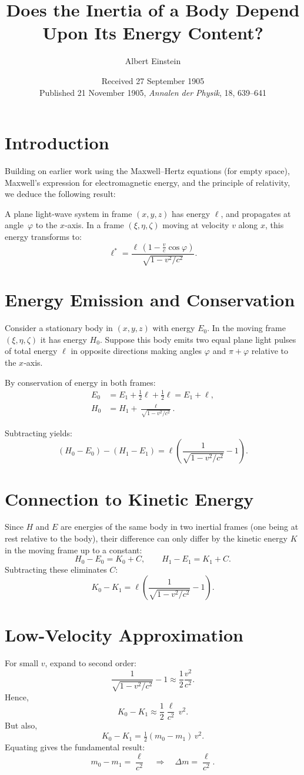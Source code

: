 \documentclass[12pt]{article}
\title{Does the Inertia of a Body Depend Upon Its Energy Content?}
\author{Albert Einstein}
\date{Received 27 September 1905\\Published 21 November 1905, \emph{Annalen der Physik}, 18, 639–641}
\begin{document}
\maketitle

\section*{Introduction}
Building on earlier work using the Maxwell--Hertz equations (for empty space), Maxwell's expression for electromagnetic energy, and the principle of relativity, we deduce the following result:

A plane light‐wave system in frame $(x,y,z)$ has energy $\ell$, and propagates at angle~$\varphi$ to the $x$‐axis. In a frame $(\xi,\eta,\zeta)$ moving at velocity $v$ along $x$, this energy transforms to:
\[
\ell^* = \frac{\ell\,(1 - \tfrac{v}{c}\cos\varphi)}{\sqrt{1 - v^2/c^2}}.
\]

\section*{Energy Emission and Conservation}
Consider a stationary body in $(x,y,z)$ with energy $E_0$. In the moving frame $(\xi,\eta,\zeta)$ it has energy $H_0$. Suppose this body emits two equal plane light pulses of total energy $\ell$ in opposite directions making angles $\varphi$ and $\pi + \varphi$ relative to the $x$‐axis.

By conservation of energy in both frames:
\begin{align*}
E_0 &= E_1 + \tfrac12\ell + \tfrac12\ell = E_1 + \ell,\\
H_0 &= H_1 + \frac{\ell}{\sqrt{1 - v^2/c^2}}.
\end{align*}

Subtracting yields:
\[
(H_0 - E_0) - (H_1 - E_1) = \ell\left( \frac{1}{\sqrt{1 - v^2/c^2}} - 1 \right).
\]

\section*{Connection to Kinetic Energy}
Since $H$ and $E$ are energies of the same body in two inertial frames (one being at rest relative to the body), their difference can only differ by the kinetic energy $K$ in the moving frame up to a constant:
\[
H_0 - E_0 = K_0 + C,\qquad H_1 - E_1 = K_1 + C.
\]
Subtracting these eliminates $C$:
\[
K_0 - K_1 = \ell\left( \frac{1}{\sqrt{1 - v^2/c^2}} - 1 \right).
\]

\section*{Low-Velocity Approximation}
For small $v$, expand to second order:
\[
\frac{1}{\sqrt{1 - v^2/c^2}} - 1 \approx \frac12\frac{v^2}{c^2}.
\]
Hence,
\[
K_0 - K_1 \approx \frac12\frac{\ell}{c^2}\,v^2.
\]
But also,
\[
K_0 - K_1 = \tfrac12(m_0 - m_1)\,v^2.
\]
Equating gives the fundamental result:
\[
m_0 - m_1 = \frac{\ell}{c^2} \quad\Longrightarrow\quad \Delta m = \frac{\ell}{c^2}.
\]
\end{document}
